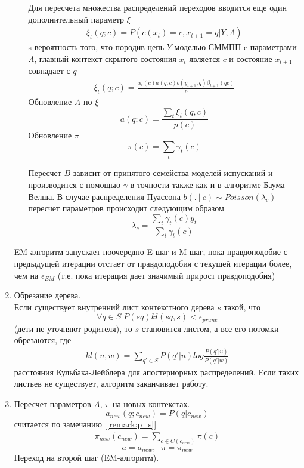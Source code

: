 \documentclass{matmex-diploma-custom}
\begin{document}
\begin{enumerate}
\begin{enumerate}
Для пересчета множества распределений переходов вводится еще один дополнительный параметр $\xi$
\begin{align*}
\xi_{t}(q;c) = P(c(x_{t})=c, x_{t+1} = q| Y, \Lambda)
\end{align*}s
вероятность того, что породив цепь $Y$ моделью СММПП c параметрами $\Lambda$, 
главный контекст скрытого состояния $ x_{t} $ является $c$ и состояние $ x_{t+1} $ совпадает с $q$
\begin{align*}
\xi_{t}(q;c) = \frac{\alpha_{t}(c)a(q;c)b(y_{t+1},q)\beta_{t+1}(qc)}{p} 
\end{align*}
Обновление $ A $ по $ \xi $\\
$$ a(q; c) = \frac{\sum_{t}\xi_{t}(q,c)}{p(c)}$$
Обновление $\pi$
$$\pi(c) = \sum_{t}\gamma_{t}(c)$$

Пересчет $ B $ зависит от принятого семейства моделей испусканий и производится с помощью $ \gamma $ в точности также как и в алгоритме Баума-Велша.
В случае распределения Пуассона
$b(.~|~c) \sim Poisson(\lambda_{c})$ 
пересчет параметров происходит следующим образом
$$ \lambda_{c} = \frac{\sum_{t}{\gamma_{t}(c)y_{t}}}{\sum_{t}{\gamma_{t}(c)}}$$
\end{enumerate}
EM-алгоритм запускает поочередно E-шаг и M-шаг, пока правдоподобие с предыдущей итерации отстает от правдоподобия с текущей итерации более, чем на $ \epsilon_{\textit{EM}}$
(т.е. пока итерация дает значимый прирост правдоподобия)
\item Обрезание дерева.\\
Если существует внутренний лист контекстного дерева $ s $ такой, что 
$$ \forall q \in S \; P(sq)kl(sq, s) < \epsilon_{\textit{prune}} $$
(дети не уточняют родителя), то $ s $ становится листом, а все его потомки обрезаются, где
\begin{align*}
kl(u, w) = \sum_{q' \in S} P(q'|u) log\frac{P(q'|u)}{P(q'|w)}
\end{align*}
расстояния Кульбака-Лейблера для апостериорных распределений.
Если таких листьев не существует, алгоритм заканчивает работу.
\item Пересчет параметров $ A $, $\pi$ на новых контекстах.
$$a_{\textit{new}}(q; c_{\textit{new}}) = P(q| c_{\textit{new}})$$
считается по замечанию [\ref{remark:p_s}]
\begin{align*}
\pi_{\textit{new}}(c_{\textit{new}}) = \sum_{c \in C(c_{\textit{new}})}{\pi(c)}
\end{align*}
$$
a = a_{\textit{new}},\;\;
\pi = \pi_{\textit{new}}
$$
Переход на второй шаг (EM-алгоритм).

\end{enumerate}
\end{document}
